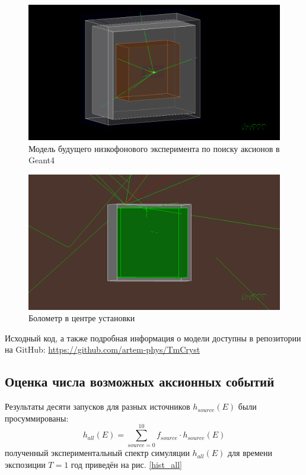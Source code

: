 \documentclass[a4paper,article,14pt]{extarticle}
\begin{document}
\begin{figure}[h]
    \centering
    \includegraphics[width = 0.85 \textwidth]{images/TmCrystVis.png}
    \caption{Модель будущего низкофонового эксперимента по поиску аксионов в Geant4}
    \label{TmVis}
\end{figure}

\begin{figure}[h!]
    \centering
    \includegraphics[width = 0.85 \textwidth]{images/Bolometer.png}
    \caption{Болометр в центре установки}
    \label{TmVisBol}
\end{figure}


Исходный код, а также подробная информация о модели доступны в репозитории на GitHub: \hyperlink{https://github.com/artem-phys/TmCryst}{https://github.com/artem-phys/TmCryst}


\subsection{Оценка числа возможных аксионных событий}
Результаты десяти запусков для разных источников $h_{source}\left( E \right)$ были просуммированы:
\begin{equation}
    {h_{all}}\left( E \right) = \sum\limits_{source = 0}^{10} {{f_{source}} \cdot {h_{source}}\left( E \right)}
\end{equation}
полученный экспериментальный спектр симуляции $h_{all} \left( E \right)$ для времени экспозиции $T = 1 \text{ год}$ приведён на рис. \ref{hist_all}
\end{document}

